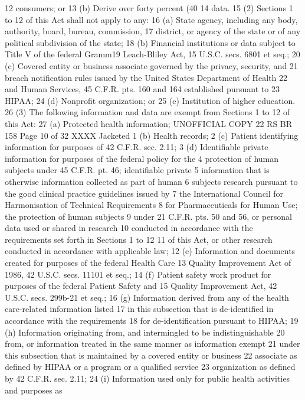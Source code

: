 12 consumers; or
13 (b) Derive over forty percent (40%
14 data.
15 (2) Sections 1 to 12 of this Act shall not apply to any:
16 (a) State agency, including any body, authority, board, bureau, commission,
17 district, or agency of the state or of any political subdivision of the state;
18 (b) Financial institutions or data subject to Title V of the federal Gramm19 Leach-Bliley Act, 15 U.S.C. secs. 6801 et seq.;
20 (c) Covered entity or business associate governed by the privacy, security, and
21 breach notification rules issued by the United States Department of Health
22 and Human Services, 45 C.F.R. pts. 160 and 164 established pursuant to
23 HIPAA;
24 (d) Nonprofit organization; or
25 (e) Institution of higher education.
26 (3) The following information and data are exempt from Sections 1 to 12 of this Act:
27 (a) Protected health information;
UNOFFICIAL COPY 22 RS BR 158
Page 10 of 32
XXXX Jacketed
1 (b) Health records;
2 (c) Patient identifying information for purposes of 42 C.F.R. sec. 2.11;
3 (d) Identifiable private information for purposes of the federal policy for the
4 protection of human subjects under 45 C.F.R. pt. 46; identifiable private
5 information that is otherwise information collected as part of human
6 subjects research pursuant to the good clinical practice guidelines issued by
7 the International Council for Harmonisation of Technical Requirements
8 for Pharmaceuticals for Human Use; the protection of human subjects
9 under 21 C.F.R. pts. 50 and 56, or personal data used or shared in research
10 conducted in accordance with the requirements set forth in Sections 1 to 12
11 of this Act, or other research conducted in accordance with applicable law;
12 (e) Information and documents created for purposes of the federal Health Care
13 Quality Improvement Act of 1986, 42 U.S.C. secs. 11101 et seq.;
14 (f) Patient safety work product for purposes of the federal Patient Safety and
15 Quality Improvement Act, 42 U.S.C. secs. 299b-21 et seq.;
16 (g) Information derived from any of the health care-related information listed
17 in this subsection that is de-identified in accordance with the requirements
18 for de-identification pursuant to HIPAA;
19 (h) Information originating from, and intermingled to be indistinguishable
20 from, or information treated in the same manner as information exempt
21 under this subsection that is maintained by a covered entity or business
22 associate as defined by HIPAA or a program or a qualified service
23 organization as defined by 42 C.F.R. sec. 2.11;
24 (i) Information used only for public health activities and purposes as
